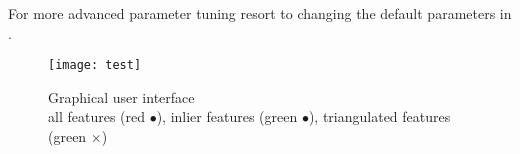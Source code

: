 For more advanced parameter tuning resort to changing the default parameters in .

\begin{figure}[ht]
	\centering
	\texttt{[image: test]}
	\captionsetup{justification=centering}
	\caption{Graphical user interface \\all features (red $\bullet$), inlier features (green $\bullet$), triangulated features (green $\times$)}
	\label{img_gui}
\end{figure}


\clearpage{\pagestyle{plain}\cleardoublepage}

\clearpage{\pagestyle{plain}\cleardoublepage}